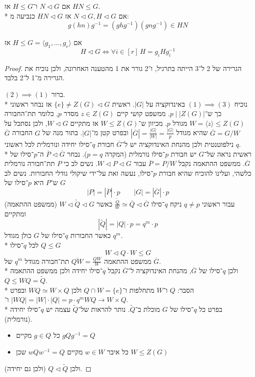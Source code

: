 \begin{remark}
	אם $N \triangleleft G$ ו־$H \le G$ אז $HN \le G$. \\*
	אם $N \triangleleft G, H \triangleleft G$ אז $HN \triangleleft G$ כנביעה מ:
	\[
		g(hn)g^{-1} = (ghg^{-1})(gng^{-1}) \in HN
	\]
\end{remark}
\begin{remark}
	אם $H \le G = \langle g_1, \dots, g_e \rangle$ אז
	\[
		H \triangleleft G \iff \forall i \in [r] \, H = g_i H g_i^{-1}
	\]
\end{remark}
\begin{proof}
	הגרירה של 2 ל־3 הייתה בתרגיל, ו־2 גורר את 1 מהטענה האחרונה, ולכן נוכיח את הגרירה מ־1 ל־2 בלבד.

	$(2) \implies (1)$ ברור.\\*
	נוכיח $(1) \implies (3)$ באינדוקציה על $|G|$.
	ראשית $\{e\} \ne Z(G) \triangleleft G$ אז נבחר ראשוני כך ש־$p \mid |Z(G)|$.
	ממשפט קושי קיים $z \in Z(G)$ מסדר $p$, כלומר תת־החבורה $W = \langle z \rangle \le Z(G)$ מגודל $p$.
	מכיוון ש־$W \le Z(G)$ אז מתקיים $W \triangleleft G$, ולכן נסתכל על $\overline{G} = G / W$ שהיא מגודל $|\overline{G}| = \frac{|G|}{|W|} = \frac{|G|}{p}$ ובפרט קטן מ־$|G|$.
	בתור מנה של $G$ החבורה $\overline{G}$ נילפוטנטית ולכן מהנחת האינדוקציה יש ל־$\overline{G}$ חבורת $q$־סילו יחידה ונורמלית לכל ראשוני $q$. \\*
	ראשית נראה של־$G$ יש חבורת $p$־סילו נורמלית (המקרה $p = q$).
	נבחר $\overline{P} \triangleleft \overline{G}$ ה־$p$־סילו של $\overline{G}$.
	ממשפט ההתאמה נקבל $\overline{P} = P / W$ עבור $W \triangleleft P \triangleleft G$.
	נשים לב כי $P$ תת־חבורה נורמלית כלשהי, ועלינו להוכיח שהיא חבורת $p$־סילו, נעשה זאת על־ידי שיקולי גודלי החבורות.
	נשים לב ש־$P$ היא $p$־סילו של $G$
	\[
		|P| = |\overline{P}| \cdot p
		\qquad
		|G| = |\overline{G}| \cdot p
	\]
	עבור ראשוני $q \ne p$ ניקח $q$־סילו $\frac{\tilde{Q}}{W} \simeq \overline{Q} \triangleleft \overline{G}$ כאשר $W \triangleleft \tilde{Q} \triangleleft G$ (ממשפט ההתאמה) ומתקיים
	\[
		|\tilde{Q}| = |Q| \cdot p = q^m \cdot p
	\]
	כאשר החבורות $q$־סילו של $G$ כולן מגודל $q^m$.\\*
	לכל $q$־סילו $Q \le G$
	\[
		W \triangleleft Q \cdot W \le G
	\]
	ממשפט ההתאמה $\overline{QW} = \frac{QW}{W}$ תת־חבורה מגודל $q^m$ של $\overline{G}$. \\*
	ולכן $q$־סילו של $\overline{G}$, מהנחת האינדוקציה ל־$\overline{G}$ נקבל $q$־סילו יחידה ולכן ממשפט ההתאמה $Q \le WQ = \tilde{Q}$. \\*
	הסבר: $Q$ ו־$W$ מתחלפות ו־$Q \cap W = \{ e \}$ ולכן $WQ \simeq W \times Q$ ובפרט $|WQ| = |W| \cdot |Q| = p \cdot q^m$ ו־$WQ \to W \times Q$. \\*
	בפרט כל $q$־סילו של $G$ מוכלת ב־$\tilde{Q}$.
	נותר להראות של־$\tilde{Q}$ עצמה יש $q$־סילו יחידה (נורמלית).
	\begin{itemize}
		\item כל $g \in Q$ מקיים $g Q g^{-1} = Q$
		\item כל איבר $w \in W$ מקיים $w Q w^{-1} = Q$ שכן $W \le Z(G)$
	\end{itemize}
	ולכן $Q \triangleleft \tilde{Q}$ (ולכן גם יחידה).
\end{proof}
